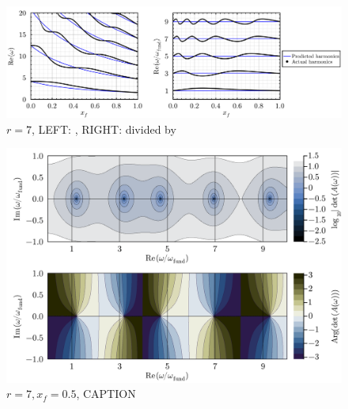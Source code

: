 
\begin{figure}[t]
\centering
\includegraphics[scale=0.35]{assets/graphs/r=7_harmonics_both.pdf}
\caption{$r = 7$, LEFT: , RIGHT: divided by }
\label{fig:flame-harmonics}
\end{figure}

\begin{figure}[t]
\centering
\includegraphics[scale=0.35]{assets/graphs/r=7_xf=05_complex_harmonics.pdf}
\caption{$r = 7, x_f = 0.5$, CAPTION}
\label{fig:flame-harmonics-complex}
\end{figure}







